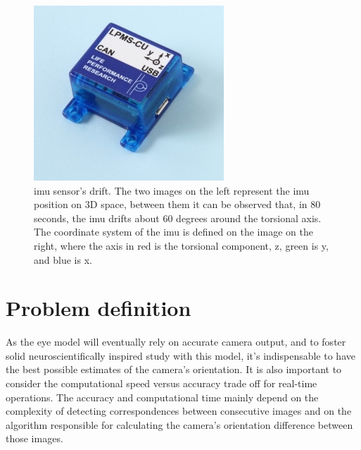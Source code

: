 \begin{figure}[ht]
\begin{minipage}[b]{0.3\linewidth}
	\end{minipage}
	\hspace{0.5cm}
	\begin{minipage}[b]{0.3\linewidth}
		\centering
		\includegraphics[width=\textwidth]{images/lpmscu.jpg}
	\end{minipage}
	\caption[ \acrshort{imu} sensor's drift]{ \acrshort{imu} sensor's drift. The two images on the left represent the  \acrshort{imu} position on 3D space, between them it can be observed that, in 80 seconds, the  \acrshort{imu} drifts about 60 degrees around the torsional axis. The coordinate system of the  \acrshort{imu} is defined on the image on the right, where the axis in red is the torsional component, z, green is y, and blue is x.}
	\label{cha1:sec1:fig:imu}
\end{figure}

\section{Problem definition}
\label{cha1:problemdef}
As the eye model will eventually rely on accurate camera output, and to foster solid neuroscientifically inspired study with this model, it's indispensable to have the best possible estimates of the camera's orientation. It is also important to consider the computational speed versus accuracy trade off for real-time operations. The accuracy and computational time mainly depend on the complexity of detecting correspondences between consecutive images and on the algorithm responsible for calculating the camera's orientation difference between those images. 

